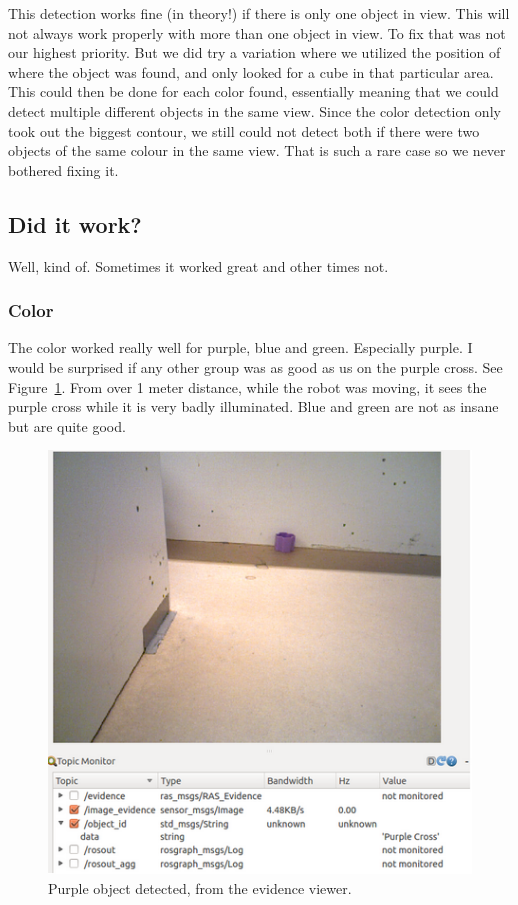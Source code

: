 This detection works fine (in theory!) if there is only one object in view. This
will not always work properly with more than one object in view. To fix that was
not our highest priority. But we did try a variation where we utilized the
position of where the object was found, and only looked for a cube in that
particular area. This could then be done for each color found, essentially
meaning that we could detect multiple different objects in the same view. Since
the color detection only took out the biggest contour, we still could not detect
both if there were two objects of the same colour in the same view. That is such
a rare case so we never bothered fixing it.

\subsection{Did it work?}
Well, kind of. Sometimes it worked great and other times not.

\subsubsection{Color}
The color worked really well for purple, blue and green. Especially purple. I
would be surprised if any other group was as good as us on the purple cross. See
Figure~\ref{fig:longpurple}. From over 1 meter distance, while the robot was
moving, it sees the purple cross while it is very badly illuminated. Blue and
green are not as insane but are quite good.
\begin{figure}
  \centering
  \includegraphics[width=\linewidth]{images/longpurple.png}
  \caption{Purple object detected, from the evidence viewer.}
  \label{fig:longpurple}
\end{figure}


